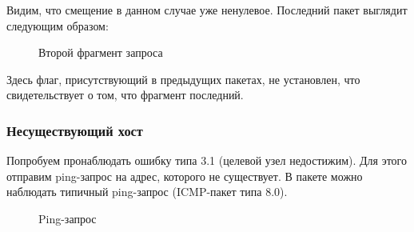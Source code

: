 \documentclass[a4paper, 14pt,russian]{article}
\begin{document}
		Видим, что смещение в данном случае уже ненулевое. Последний пакет выглядит следующим образом:
		\begin{figure}[h!]
			\caption{Второй фрагмент запроса}
			\label{img:frag_ping}
		\end{figure}
	
		Здесь флаг, присутствующий в предыдущих пакетах, не установлен, что свидетельствует о том, что фрагмент последний. 	
	
	\subsubsection{Несуществующий хост}
	Попробуем пронаблюдать ошибку типа 3.1 (целевой узел недостижим). Для этого отправим ping-запрос на адрес, которого не существует.																																						
	В пакете можно наблюдать типичный ping-запрос (ICMP-пакет типа 8.0).
	\begin{figure}[h!]
		\caption{Ping-запрос}
		\label{img:error_ping}
	\end{figure}
\end{document}
